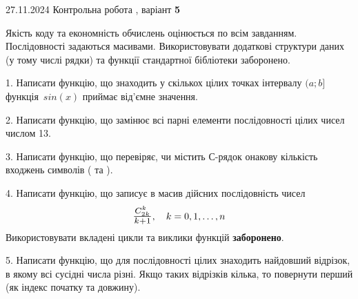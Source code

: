 \documentclass[12pt, ukrainian]{article}
\begin{document}
{{{{\begin {large}
\end{large}
\newpage
{{27.11.2024 Контрольна робота , варіант  \No \textbf { 5 }\par}}


{
Якість коду та економність обчислень оцінюється по всім завданням. Послідовності задаються масивами. Використовувати додаткові структури даних (у тому числі рядки) та функції стандартної бібліотеки заборонено.

\vspace{2mm}

\begin {large}
1. Написати функцію, що знаходить у скількох цілих точках інтервалу $(a; b]$ функція~$sin(x)$ приймає від'ємне значення.

\vspace{2mm}


2. Написати функцію, що замінює всі парні елементи послідовності цілих чисел числом 13.

\vspace{2mm}


3. Написати функцію, що перевіряє, чи містить С-рядок онакову кількість входжень символів ( та ).

\vspace{2mm}


4. 
Написати функцію, що записує в масив дійсних послідовність чисел
$$\scalebox{1.2}{$\frac{C_{2k}^k}{k+1}$}, \quad k=0,1,\ldots,n$$
Використовувати вкладені цикли та виклики функцій \textbf{заборонено}.

\vspace{2mm}


5. Написати функцію, що для послідовності цілих знаходить найдовший відрізок, в якому всі сусідні числа різні. Якщо таких відрізків кілька, то повернути перший (як індекс початку та довжину).

\vspace{2mm}

\end{large}
\vspace{35mm}


}}}}}
\end{document}
